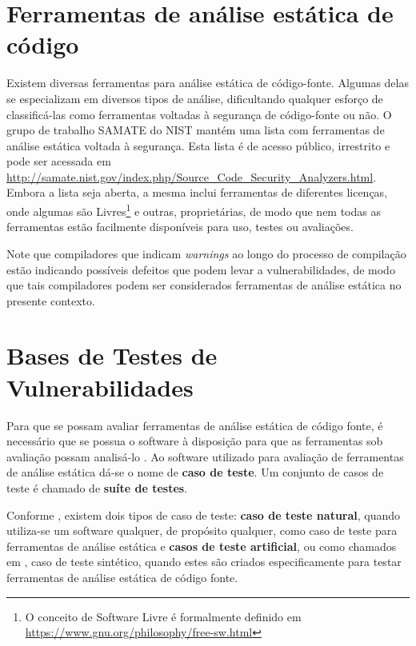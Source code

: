   \section{Ferramentas de análise estática de código}

  Existem diversas ferramentas para análise estática de código-fonte. Algumas delas se especializam em diversos tipos de análise, dificultando qualquer esforço de classificá-las como ferramentas voltadas à segurança de código-fonte ou não. O grupo de trabalho SAMATE do  NIST mantém uma lista com ferramentas de análise estática voltada à segurança. Esta lista é de acesso público, irrestrito e pode ser acessada em \url{http://samate.nist.gov/index.php/Source_Code_Security_Analyzers.html}. Embora a lista seja aberta, a mesma inclui ferramentas de diferentes licenças, onde algumas são Livres\footnote{O conceito de Software Livre é formalmente definido em \url{https://www.gnu.org/philosophy/free-sw.html}} e outras, proprietárias, de modo que nem todas as ferramentas estão facilmente disponíveis para uso, testes ou avaliações.

  Note que compiladores que indicam \textit{warnings} ao longo do processo de compilação estão indicando possíveis defeitos que podem levar a vulnerabilidades, de modo que tais compiladores podem ser considerados ferramentas de análise estática no presente contexto.


  \section{Bases de Testes de Vulnerabilidades}\label{fundamentacao_teorica::bases_de_testes_de_vulnerabilidade}

  Para que se possam avaliar ferramentas de análise estática de código fonte, é necessário que se possua o software à disposição para que as ferramentas sob avaliação possam analisá-lo \cite{nsa}. Ao software utilizado para avaliação de ferramentas de análise estática dá-se o nome de \textbf{caso de teste}. Um conjunto de casos de teste é chamado de \textbf{suíte de testes}.

  Conforme \cite{nsa}, existem dois tipos de caso de teste: \textbf{caso de teste natural}, quando utiliza-se um software qualquer, de propósito qualquer, como caso de teste para ferramentas de análise estática e \textbf{casos de teste artificial}, ou como chamados em \cite {juliet}, caso de teste sintético, quando estes são criados especificamente para testar ferramentas de análise estática de código fonte.

